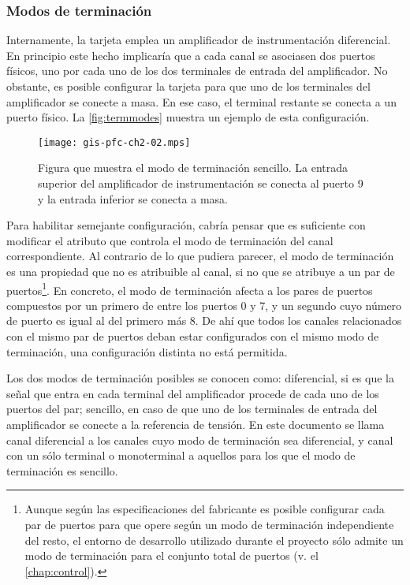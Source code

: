 \subsubsection{Modos de terminación}\label{subsubsec:termmodes}

Internamente, la tarjeta \kpci{} emplea un amplificador de instrumentación
diferencial. En principio este hecho implicaría que a cada canal se
asociasen dos puertos físicos, uno por cada uno de los dos terminales de
entrada del amplificador. No obstante, es posible configurar la tarjeta
para que uno de los terminales del amplificador se conecte a masa. En ese
caso, el terminal restante se conecta a un puerto físico. La
\vref{fig:termmodes} muestra un ejemplo de esta configuración.

\begin{figure}
	\begin{center}
		\texttt{[image: gis-pfc-ch2-02.mps]}
	\end{center}
	\caption[Ejemplo de configuración de terminación]{Figura que
	muestra el modo de terminación sencillo. La entrada superior del
	amplificador de instrumentación se conecta al puerto 9 y la entrada
	inferior se conecta a masa.}
	\label{fig:termmodes}
\end{figure}

Para habilitar semejante configuración, cabría pensar que es suficiente con
modificar el atributo que controla el modo de terminación del canal
correspondiente. Al contrario de lo que pudiera parecer, el modo de
terminación es una propiedad que no es atribuible al canal, si no que se
atribuye a un par de puertos\footnote{Aunque según las especificaciones del
fabricante es posible configurar cada par de puertos para que opere según
un modo de terminación independiente del resto, el entorno de desarrollo
utilizado durante el proyecto sólo admite un modo de terminación para el
conjunto total de puertos (v. el \vref{chap:control}).}. En concreto, el
modo de terminación afecta a los pares de puertos compuestos por un primero
de entre los puertos 0 y 7, y un segundo cuyo número de puerto es igual al
del primero más 8. De ahí que todos los canales relacionados con el mismo
par de puertos deban estar configurados con el mismo modo de terminación,
una configuración distinta no está permitida.

Los dos modos de terminación posibles se conocen como: diferencial, si es
que la señal que entra en cada terminal del amplificador procede de cada
uno de los puertos del par; sencillo, en caso de que uno de los terminales
de entrada del amplificador se conecte a la referencia de tensión. En este
documento se llama canal diferencial a los canales cuyo modo de terminación
sea diferencial, y canal con un sólo terminal o monoterminal a aquellos
para los que el modo de terminación es sencillo.

